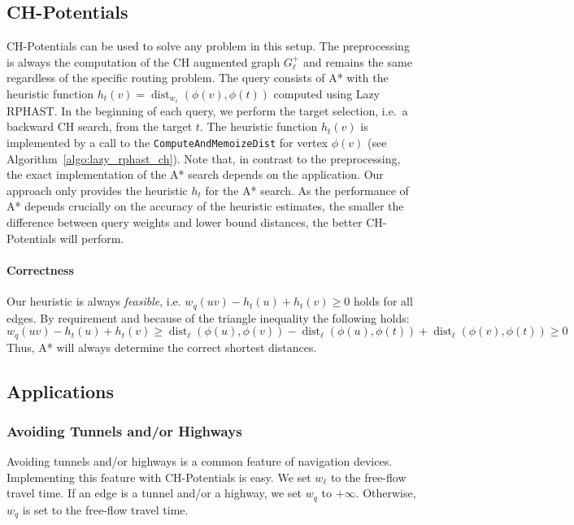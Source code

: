 \documentclass[manuscript,review]{acmart}
\newcommand*{\dist}{\operatorname{dist}}
\begin{document}
\subsection{CH-Potentials}\label{sec:chpot}
CH-Potentials can be used to solve any problem in this setup.
The preprocessing is always the computation of the CH augmented graph $G^+_{\ell}$ and remains the same regardless of the specific routing problem.
The query consists of A* with the heuristic function $h_t(v) = \dist_{w_{\ell}}(\phi(v), \phi(t))$ computed using Lazy RPHAST.
In the beginning of each query, we perform the target selection, i.e.\ a backward CH search, from the target $t$.
The heuristic function $h_t(v)$ is implemented by a call to the \texttt{ComputeAndMemoizeDist} for vertex $\phi(v)$ (see Algorithm~\ref{algo:lazy_rphast_ch}).
Note that, in contrast to the preprocessing, the exact implementation of the A* search depends on the application.
Our approach only provides the heuristic $h_t$ for the A* search.
As the performance of A* depends crucially on the accuracy of the heuristic estimates, the smaller the difference between query weights and lower bound distances, the better CH-Potentials will perform.

\paragraph{Correctness}
Our heuristic is always \emph{feasible}, i.e. $w_q(u v) - h_t(u) + h_t(v) \geq 0$ holds for all edges.
By requirement and because of the triangle inequality the following holds:
\[
w_q(u v) - h_t(u) + h_t(v) \geq \dist_\ell(\phi(u), \phi(v)) - \dist_\ell(\phi(u), \phi(t)) + \dist_\ell(\phi(v), \phi(t)) \geq 0
\]
Thus, A* will always determine the correct shortest distances.

\subsection{Applications}\label{sec:applications}
\subsubsection{Avoiding Tunnels and/or Highways}
\label{sec:no-tunnel-highway}

Avoiding tunnels and/or highways is a common feature of navigation devices.
Implementing this feature with CH-Potentials is easy.
We set $w_\ell$ to the free-flow travel time.
If an edge is a tunnel and/or a highway, we set $w_q$ to $+\infty$.
Otherwise, $w_q$ is set to the free-flow travel time.
\end{document}
